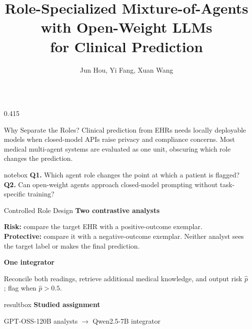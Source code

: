 \documentclass[final,xcolor=table]{beamer}
\title{Role-Specialized Mixture-of-Agents with Open-Weight LLMs
\\[10pt]
for Clinical Prediction}
\author{Jun Hou, Yi Fang, Xuan Wang}
\institute{{junh, yif, xuanw}@vt.edu}
\newcommand{\smallcapslabel}[1]{\textcolor{VTMaroon}{\textbf{#1}}}
\begin{document}
\begin{frame}[t]

\setlength{\columnsep}{0.70cm}
\begin{columns}[t,totalwidth=\textwidth]
  \begin{column}{0.415\textwidth}
    \begin{block}{Why Separate the Roles?}
      \justifying
      Clinical prediction from EHRs needs locally deployable models when
      closed-model APIs raise privacy and compliance concerns. Most medical
      multi-agent systems are evaluated as one unit, obscuring which role
      changes the prediction.

      \vspace{0.50em}
      \begin{beamercolorbox}[wd=\linewidth,rounded=true,sep=0.48em]{notebox}
        \textbf{Q1.} Which agent role changes the point at which a patient
        is flagged?\\[0.36em]
        \textbf{Q2.} Can open-weight agents approach closed-model prompting
        without task-specific training?
      \end{beamercolorbox}
    \end{block}

    \vspace{0.28cm}

    \begin{block}{Controlled Role Design}
      \smallcapslabel{Two contrastive analysts}\par
      \textcolor{AnalystBlue}{\textbf{Risk:}} compare the target EHR with a
      positive-outcome exemplar.\\[0.25em]
      \textcolor{ProtectTeal}{\textbf{Protective:}} compare it with a
      negative-outcome exemplar. Neither analyst sees the target label or
      makes the final prediction.

      \vspace{0.42em}
      \smallcapslabel{One integrator}\par
      Reconcile both readings, retrieve additional medical knowledge, and
      output risk $\hat p$; flag when $\hat p>0.5$.

      \vspace{0.44em}
      \begin{beamercolorbox}[wd=\linewidth,rounded=true,sep=0.46em]{resultbox}
        \centering
        \textbf{Studied assignment}\par\vspace{0.08em}
        {\fontsize{26}{30}\selectfont
        GPT-OSS-120B analysts $\rightarrow$ Qwen2.5-7B integrator}
      \end{beamercolorbox}


\end{block}
\end{column}
\end{columns}
\end{frame}
\end{document}
